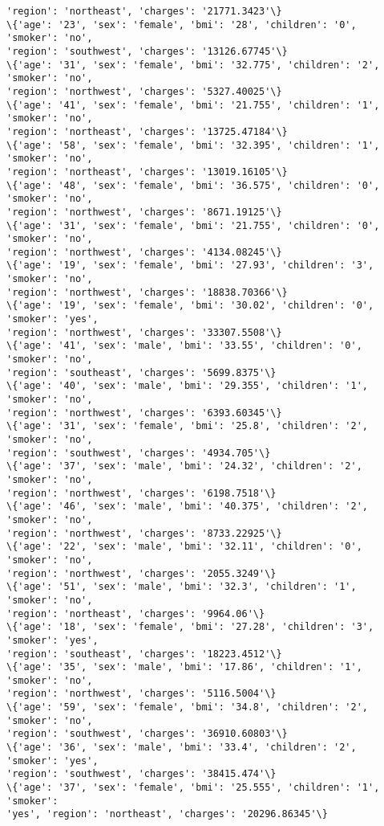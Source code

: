 \documentclass[11pt]{article}
\begin{document}
\begin{Verbatim}[commandchars=\\\{\}]
'region': 'northeast', 'charges': '21771.3423'\}
\{'age': '23', 'sex': 'female', 'bmi': '28', 'children': '0', 'smoker': 'no',
'region': 'southwest', 'charges': '13126.67745'\}
\{'age': '31', 'sex': 'female', 'bmi': '32.775', 'children': '2', 'smoker': 'no',
'region': 'northwest', 'charges': '5327.40025'\}
\{'age': '41', 'sex': 'female', 'bmi': '21.755', 'children': '1', 'smoker': 'no',
'region': 'northeast', 'charges': '13725.47184'\}
\{'age': '58', 'sex': 'female', 'bmi': '32.395', 'children': '1', 'smoker': 'no',
'region': 'northeast', 'charges': '13019.16105'\}
\{'age': '48', 'sex': 'female', 'bmi': '36.575', 'children': '0', 'smoker': 'no',
'region': 'northwest', 'charges': '8671.19125'\}
\{'age': '31', 'sex': 'female', 'bmi': '21.755', 'children': '0', 'smoker': 'no',
'region': 'northwest', 'charges': '4134.08245'\}
\{'age': '19', 'sex': 'female', 'bmi': '27.93', 'children': '3', 'smoker': 'no',
'region': 'northwest', 'charges': '18838.70366'\}
\{'age': '19', 'sex': 'female', 'bmi': '30.02', 'children': '0', 'smoker': 'yes',
'region': 'northwest', 'charges': '33307.5508'\}
\{'age': '41', 'sex': 'male', 'bmi': '33.55', 'children': '0', 'smoker': 'no',
'region': 'southeast', 'charges': '5699.8375'\}
\{'age': '40', 'sex': 'male', 'bmi': '29.355', 'children': '1', 'smoker': 'no',
'region': 'northwest', 'charges': '6393.60345'\}
\{'age': '31', 'sex': 'female', 'bmi': '25.8', 'children': '2', 'smoker': 'no',
'region': 'southwest', 'charges': '4934.705'\}
\{'age': '37', 'sex': 'male', 'bmi': '24.32', 'children': '2', 'smoker': 'no',
'region': 'northwest', 'charges': '6198.7518'\}
\{'age': '46', 'sex': 'male', 'bmi': '40.375', 'children': '2', 'smoker': 'no',
'region': 'northwest', 'charges': '8733.22925'\}
\{'age': '22', 'sex': 'male', 'bmi': '32.11', 'children': '0', 'smoker': 'no',
'region': 'northwest', 'charges': '2055.3249'\}
\{'age': '51', 'sex': 'male', 'bmi': '32.3', 'children': '1', 'smoker': 'no',
'region': 'northeast', 'charges': '9964.06'\}
\{'age': '18', 'sex': 'female', 'bmi': '27.28', 'children': '3', 'smoker': 'yes',
'region': 'southeast', 'charges': '18223.4512'\}
\{'age': '35', 'sex': 'male', 'bmi': '17.86', 'children': '1', 'smoker': 'no',
'region': 'northwest', 'charges': '5116.5004'\}
\{'age': '59', 'sex': 'female', 'bmi': '34.8', 'children': '2', 'smoker': 'no',
'region': 'southwest', 'charges': '36910.60803'\}
\{'age': '36', 'sex': 'male', 'bmi': '33.4', 'children': '2', 'smoker': 'yes',
'region': 'southwest', 'charges': '38415.474'\}
\{'age': '37', 'sex': 'female', 'bmi': '25.555', 'children': '1', 'smoker':
'yes', 'region': 'northeast', 'charges': '20296.86345'\}

\end{Verbatim}
\end{document}
